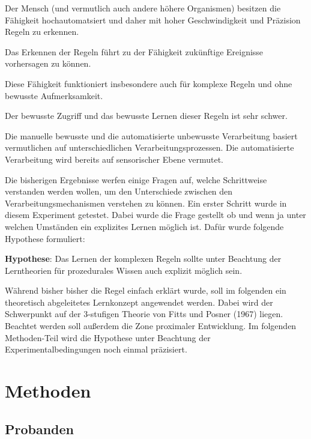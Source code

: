 \documentclass[doc,a4paper,12pt]{apa6}
\begin{document}
\begin{compactitem}
\item Der Mensch (und vermutlich auch andere höhere Organismen) besitzen die Fähigkeit hochautomatsiert und daher mit hoher Geschwindigkeit und Präzision Regeln zu erkennen.
\item Das Erkennen der Regeln führt zu der Fähigkeit zukünftige Ereignisse vorhersagen zu können.
\item Diese Fähigkeit funktioniert insbesondere auch für komplexe Regeln und ohne bewusste Aufmerksamkeit.
\item Der bewusste Zugriff und das bewusste Lernen dieser Regeln ist sehr schwer.
\item Die manuelle bewusste und die automatisierte unbewusste Verarbeitung basiert vermutlichen auf unterschiedlichen Verarbeitungsprozessen. Die automatisierte Verarbeitung wird bereits auf sensorischer Ebene vermutet.
\end{compactitem}

Die bisherigen Ergebnisse werfen einige Fragen auf, welche Schrittweise verstanden werden wollen, um den Unterschiede zwischen den Verarbeitungsmechanismen verstehen zu können. Ein erster Schritt wurde in diesem Experiment getestet. Dabei wurde die Frage gestellt ob und wenn ja unter welchen Umständen ein explizites Lernen möglich ist. Dafür wurde folgende Hypothese formuliert:

\textbf{Hypothese}: Das Lernen der komplexen Regeln sollte unter Beachtung der Lerntheorien für prozedurales Wissen auch explizit möglich sein.

Während bisher bisher die Regel einfach erklärt wurde, soll im folgenden ein theoretisch abgeleitetes Lernkonzept angewendet werden. Dabei wird der Schwerpunkt auf der 3-stufigen Theorie von Fitts und Posner (1967) liegen. Beachtet werden soll außerdem die Zone proximaler Entwicklung. Im folgenden Methoden-Teil wird die Hypothese unter Beachtung der Experimentalbedingungen noch einmal präzisiert.


\section{Methoden}

\subsection{Probanden}
\end{document}
